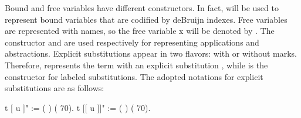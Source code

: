 \documentclass[12pt]{report}
\begin{document}
Bound and free variables have different constructors. In fact,  will be used to represent bound variables that are codified by deBruijn indexes. Free variables are represented with names, so the free variable x will be denoted by  . The constructor  and  are used respectively for representing applications and abstractions. Explicit substitutions appear in two flavors: with or without marks. Therefore,    represents the term  with an explicit substitution , while    is the constructor for labeled substitutions. The adopted notations for explicit substitutions are as follows: \begin{coqdoccode}
\coqdocemptyline
\coqdocnoindent
{} t [ u ]" := (  ) (  70).\coqdoceol
\coqdocnoindent
{} t [[ u ]]" := (  ) (  70).\coqdoceol
\coqdocemptyline
\end{coqdoccode}
\end{document}
